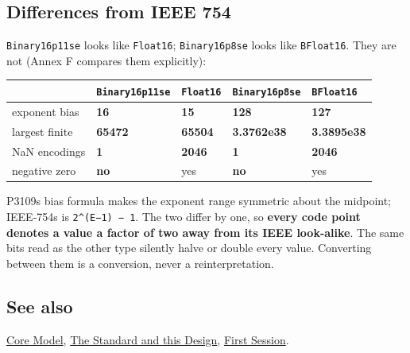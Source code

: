 \subsection{Differences from IEEE 754}



\label{153811621810957742}{}


\texttt{Binary16p11se} looks like \texttt{Float16}; \texttt{Binary16p8se} looks like \texttt{BFloat16}. They are not (Annex F compares them explicitly):




\begin{table}[h]
\centering
\begin{tabulary}{\linewidth}{L L L L L}
\toprule
 & \texttt{Binary16p11se} & \texttt{Float16} & \texttt{Binary16p8se} & \texttt{BFloat16} \\
\toprule
exponent bias & \textbf{16} & \textbf{15} & \textbf{128} & \textbf{127} \\
largest finite & \textbf{65472} & \textbf{65504} & \textbf{3.3762e38} & \textbf{3.3895e38} \\
NaN encodings & \textbf{1} & \textbf{2046} & \textbf{1} & \textbf{2046} \\
negative zero & \textbf{no} & yes & \textbf{no} & yes \\
\bottomrule
\end{tabulary}

\end{table}



P3109{\textquotesingle}s bias formula makes the exponent range symmetric about the midpoint; IEEE-754{\textquotesingle}s is \texttt{2{\textasciicircum}(E−1) − 1}. The two differ by one, so \textbf{every code point denotes a value a factor of two away from its IEEE look-alike}. The same bits read as the other type silently halve or double every value. Converting between them is a conversion, never a reinterpretation.



\subsection{See also}



\label{292862844209942199-dup2}{}


\href{core\_\allowbreak{}model.md}{Core Model}, \href{help\_\allowbreak{}standard\_\allowbreak{}design.md}{The Standard and this Design}, \href{first\_\allowbreak{}session.md}{First Session}.



